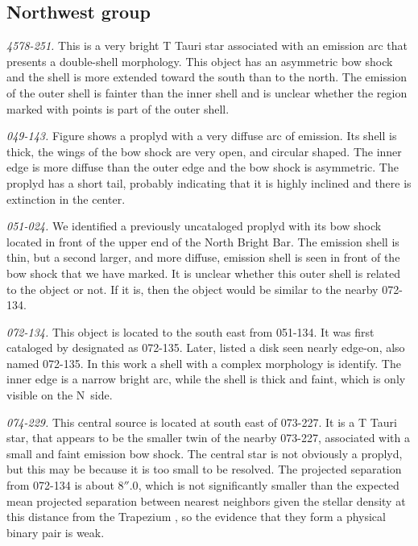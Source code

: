 \documentclass[iop, apj]{emulateapj}
\begin{document}
\subsection{Northwest group}
\label{sec:nw-group}

\textit{4578-251.} This is a very bright T Tauri star associated with an emission arc that presents a double-shell morphology. This object has an asymmetric bow shock and the shell is more extended toward the south than to the north. The emission of the outer shell is fainter than the inner shell and is unclear whether the region marked with points is part of the outer shell.

\textit{049-143.} Figure shows a proplyd \citep{Ricci:2008a} with a very diffuse arc of emission. Its shell is thick, the wings of the bow shock are very open, and circular shaped. The inner edge is more diffuse than the outer edge and the bow shock is asymmetric. The  proplyd has a short tail, probably indicating that it is highly inclined and there is extinction in the center. 
 
\textit{051-024.} We identified a previously uncataloged proplyd with its bow shock located in front of the upper end of the North Bright
Bar. The emission shell is thin, but a second larger, and more diffuse, emission shell is seen in front of the bow shock that we have
marked. It is unclear whether this outer shell is related to the object or not. If it is, then the object would be similar to the nearby 072-134. 

\textit{072-134.} This object is located to the south east from 051-134. It was first cataloged by \citet{ODell:1996a} designated as 072-135. Later, \citet{Ricci:2008a} listed a disk seen nearly edge-on, also named 072-135. In this work a shell with a complex morphology is identify. The inner edge is a narrow bright arc, while the shell is thick and faint, which is only visible on the N~side.        

\textit{074-229.} This central source is located at south east of 073-227. It is a T Tauri star, that appears to be the smaller twin of the nearby 073-227, associated with a small and faint emission bow shock. The central star is not obviously a proplyd, but this may be because it is too small to be resolved. The projected separation from 072-134 is about \(8''.0\), which is not significantly smaller than the expected mean projected separation between nearest neighbors given the stellar density at this distance from the Trapezium \citep{Reipurth:2007a}, 
so the evidence that they form a physical binary pair is weak.
\end{document}
